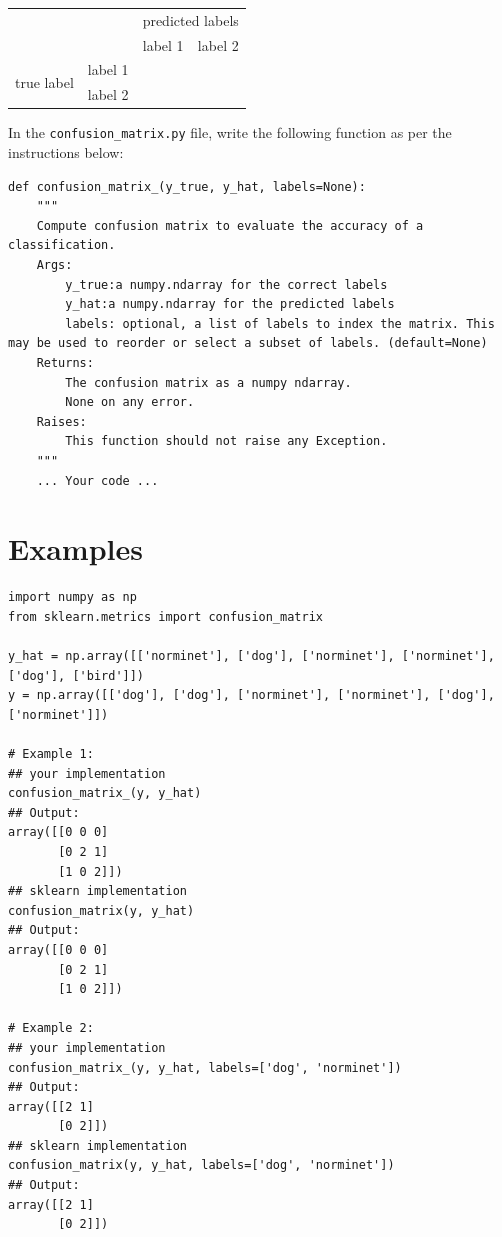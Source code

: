 \documentclass{42-en}
\begin{document}
\begin{center}
  \begin{tabular}{|c|c|c|c|}
    \cline{3-4}
    \multicolumn{2}{c|}{\multirow{2}{*}{}}  & \multicolumn{2}{|c|}{predicted labels} \\ \cline{3-4}
    \multicolumn{2}{c|}{}       & label 1 & label 2 \\
    \hline
    \multirow{2}{*}{true label} & label 1 &         &         \\
    \cline{2-4}
                                & label 2 &         &         \\
    \hline
  \end{tabular}
\end{center}

In the \texttt{confusion\_matrix.py} file, write the following function as per the instructions below:

\begin{verbatim}
def confusion_matrix_(y_true, y_hat, labels=None):
    """
    Compute confusion matrix to evaluate the accuracy of a classification.
    Args:
        y_true:a numpy.ndarray for the correct labels
        y_hat:a numpy.ndarray for the predicted labels
        labels: optional, a list of labels to index the matrix. This may be used to reorder or select a subset of labels. (default=None)
    Returns: 
        The confusion matrix as a numpy ndarray.
        None on any error.
    Raises:
        This function should not raise any Exception.
    """
    ... Your code ...
\end{verbatim}


\section*{Examples}
\begin{verbatim}
import numpy as np
from sklearn.metrics import confusion_matrix

y_hat = np.array([['norminet'], ['dog'], ['norminet'], ['norminet'], ['dog'], ['bird']])
y = np.array([['dog'], ['dog'], ['norminet'], ['norminet'], ['dog'], ['norminet']])

# Example 1: 
## your implementation
confusion_matrix_(y, y_hat)
## Output:
array([[0 0 0]
       [0 2 1]
       [1 0 2]])
## sklearn implementation
confusion_matrix(y, y_hat)
## Output:
array([[0 0 0]
       [0 2 1]
       [1 0 2]])

# Example 2:
## your implementation
confusion_matrix_(y, y_hat, labels=['dog', 'norminet'])
## Output:
array([[2 1]
       [0 2]])
## sklearn implementation
confusion_matrix(y, y_hat, labels=['dog', 'norminet'])
## Output:
array([[2 1]
       [0 2]])
\end{verbatim}
\end{document}

